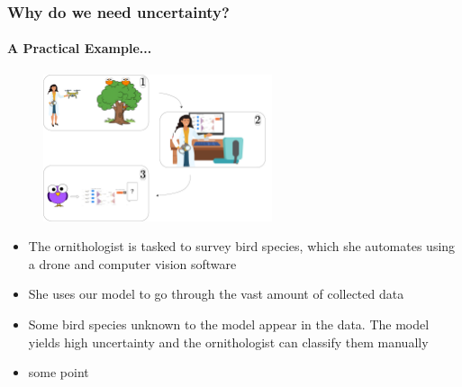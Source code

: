 \documentclass[9pt]{beamer}
\begin{document}
\begin{frame}
\frametitle{Why do we need uncertainty?}
\framesubtitle{A Practical Example...}
	\begin{figure}
		\centering
		\includegraphics[width=0.6\textwidth]{images/ornithology.pdf}
	\end{figure}
	\begin{itemize}\setlength\itemsep{1em}
	\item The ornithologist is tasked to survey bird species, which she automates using a drone and computer vision software
	\item She uses our model to go through the vast amount of collected data
	\item Some bird species unknown to the model appear in the data. The model yields high uncertainty and the ornithologist can classify them manually
	\end{itemize}
\end{frame}

\begin{frame}[plain]
\begin{itemize}
	\item some point
\end{itemize}
\end{frame}
\end{document}
